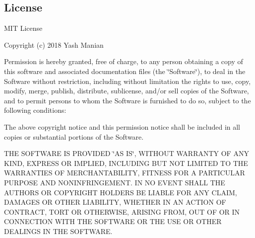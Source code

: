 \subsection*{License}

M\+IT License

Copyright (c) 2018 Yash Manian

Permission is hereby granted, free of charge, to any person obtaining a copy of this software and associated documentation files (the \char`\"{}\+Software\char`\"{}), to deal in the Software without restriction, including without limitation the rights to use, copy, modify, merge, publish, distribute, sublicense, and/or sell copies of the Software, and to permit persons to whom the Software is furnished to do so, subject to the following conditions\+:

The above copyright notice and this permission notice shall be included in all copies or substantial portions of the Software.

T\+HE S\+O\+F\+T\+W\+A\+RE IS P\+R\+O\+V\+I\+D\+ED \char`\"{}\+A\+S I\+S\char`\"{}, W\+I\+T\+H\+O\+UT W\+A\+R\+R\+A\+N\+TY OF A\+NY K\+I\+ND, E\+X\+P\+R\+E\+SS OR I\+M\+P\+L\+I\+ED, I\+N\+C\+L\+U\+D\+I\+NG B\+UT N\+OT L\+I\+M\+I\+T\+ED TO T\+HE W\+A\+R\+R\+A\+N\+T\+I\+ES OF M\+E\+R\+C\+H\+A\+N\+T\+A\+B\+I\+L\+I\+TY, F\+I\+T\+N\+E\+SS F\+OR A P\+A\+R\+T\+I\+C\+U\+L\+AR P\+U\+R\+P\+O\+SE A\+ND N\+O\+N\+I\+N\+F\+R\+I\+N\+G\+E\+M\+E\+NT. IN NO E\+V\+E\+NT S\+H\+A\+LL T\+HE A\+U\+T\+H\+O\+RS OR C\+O\+P\+Y\+R\+I\+G\+HT H\+O\+L\+D\+E\+RS BE L\+I\+A\+B\+LE F\+OR A\+NY C\+L\+A\+IM, D\+A\+M\+A\+G\+ES OR O\+T\+H\+ER L\+I\+A\+B\+I\+L\+I\+TY, W\+H\+E\+T\+H\+ER IN AN A\+C\+T\+I\+ON OF C\+O\+N\+T\+R\+A\+CT, T\+O\+RT OR O\+T\+H\+E\+R\+W\+I\+SE, A\+R\+I\+S\+I\+NG F\+R\+OM, O\+UT OF OR IN C\+O\+N\+N\+E\+C\+T\+I\+ON W\+I\+TH T\+HE S\+O\+F\+T\+W\+A\+RE OR T\+HE U\+SE OR O\+T\+H\+ER D\+E\+A\+L\+I\+N\+GS IN T\+HE S\+O\+F\+T\+W\+A\+RE. 